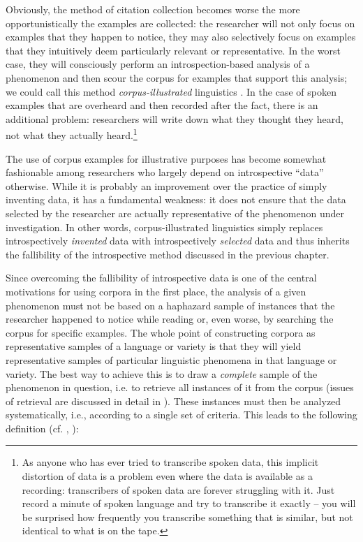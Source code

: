 Obviously, the method of citation collection becomes worse the more opportunistically the examples are collected: the researcher will not only focus on examples that they happen to notice, they may also selectively focus on examples that they intuitively  deem particularly relevant or representative.  In the worst case, they will consciously perform an introspection\hyp{}based  analysis of a phenomenon and then scour the corpus for examples that support this analysis; we could call this method \emph{corpus\hyp{}illustrated} linguistics \citep[cf.][]{tummers_usage-based_2005}. In the case of spoken  examples that are overheard and then recorded after the fact, there is an additional problem: researchers will write down what they thought they heard, not what they actually heard.\footnote{As anyone who has ever tried to transcribe  spoken  data, this implicit distortion of data is a problem even where the data is available as a recording: transcribers of spoken data are forever struggling with it. Just record a minute of spoken language and try to transcribe it exactly -- you will be surprised how frequently you transcribe something that is similar, but not identical to what is on the tape.}

The use of corpus examples for illustrative purposes has become somewhat fashionable among researchers who largely depend on introspective  ``data'' otherwise. While it is probably an improvement over the practice of simply inventing data, it has a fundamental weakness: it does not ensure that the data selected by the researcher are actually representative  of the phenomenon under investigation. In other words, corpus\hyp{}illustrated linguistics simply replaces introspectively \emph{invented} data with introspectively \emph{selected} data and thus inherits the fallibility of the introspective method discussed in the previous chapter.

Since overcoming the fallibility of introspective  data is one of the central motivations for using corpora in the first place, the analysis of a given phenomenon must not be based on a haphazard sample  of instances that the researcher happened to notice while reading or, even worse, by searching the corpus for specific examples. The whole point of constructing corpora as representative  samples of a language or variety  is that they will yield representative samples of particular linguistic phenomena in that language or variety. The best way to achieve this is to draw a \emph{complete} sample  of the phenomenon in question, i.e. to retrieve  all instances of it from the corpus (issues of retrieval are discussed in detail in ). These instances must then be analyzed systematically, i.e., according to a single set of criteria. This leads to the following definition (cf. \citealt[2]{biber_cambridge_2015}, \citealt[78]{cook_applied_2003}):

